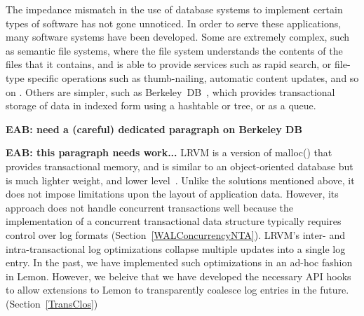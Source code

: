 \documentclass[letterpaper,twocolumn,english]{article}
\newcommand{\yad}{Lemon\xspace}
\newcommand{\eab}[1]{{\bf EAB: #1}}
\begin{document}
The impedance mismatch in the use of database systems to implement
certain types of software has not gone unnoticed.
%
%
%
In
order to serve these applications, many software systems have been 
developed.  Some are extremely complex, such as semantic file
systems, where the file system understands the contents of the files
that it contains, and is able to provide services such as rapid
search, or file-type specific operations such as thumb-nailing,
automatic content updates, and so on \cite{Reiser4,WinFS,BeOS,SemanticFSWork,SemanticWeb}.  Others are simpler, such as
Berkeley~DB~\cite{berkeleyDB, bdb}, which provides transactional
storage of data in indexed form using a hashtable or tree, or as a queue.  

\eab{need a (careful) dedicated paragraph on Berkeley DB}

\eab{this paragraph needs work...}
LRVM is a version of malloc() that provides
transactional memory, and is similar to an object-oriented database
but is much lighter weight, and lower level~\cite{lrvm}.  Unlike 
the solutions mentioned above, it does not impose limitations upon 
the layout of application data.
However, its approach does not handle concurrent
transactions well because the implementation of a concurrent transactional
data structure typically requires control over log formats (Section~\ref{WALConcurrencyNTA}).  
LRVM's inter- 
and intra-transactional log optimizations collapse multiple updates 
into a single log entry.  In the past, we have implemented such 
optimizations in an ad-hoc fashion in \yad.  However, we beleive 
that we have developed the necessary API hooks 
to allow extensions to \yad to transparently coalesce log entries in the future. (Section~\ref{TransClos})
\end{document}
